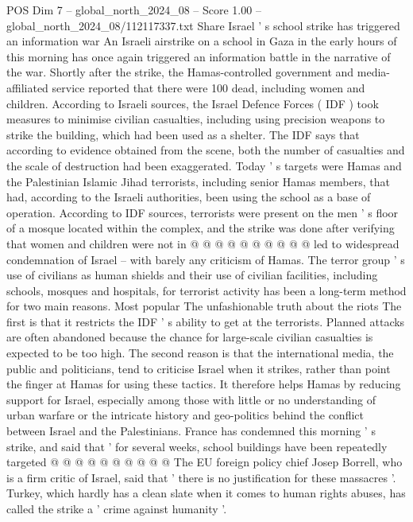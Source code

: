 \begin{textsample}{POS Dim 7 – global\_north\_2024\_08 – Score 1.00 – global\_north\_2024\_08/112117337.txt}  \label{ex:f7_pos_365}
Share Israel ' s school strike has triggered an information war An Israeli airstrike on a school in Gaza in the early hours of this morning has once again triggered an information battle in the narrative of the war.
Shortly after the strike, the Hamas-controlled government and media-affiliated service reported that there were 100 dead, including women and children.
According to Israeli sources, the Israel Defence Forces ( IDF ) took measures to minimise civilian casualties, including using precision weapons to strike the building, which had been used as a shelter.
The IDF says that according to evidence obtained from the scene, both the number of casualties and the scale of destruction had been exaggerated.
Today ' s targets were Hamas and the Palestinian Islamic Jihad terrorists, including senior Hamas members, that had, according to the Israeli authorities, been using the school as a base of operation.
According to IDF sources, terrorists were present on the men ' s floor of a mosque located within the complex, and the strike was done after verifying that women and children were not in @ @ @ @ @ @ @ @ @ @ led to widespread condemnation of Israel -- with barely any criticism of Hamas.
The terror group ' s use of civilians as human shields and their use of civilian facilities, including schools, mosques and hospitals, for terrorist activity has been a long-term method for two main reasons.
Most popular The unfashionable truth about the riots The first is that it restricts the IDF ' s ability to get at the terrorists.
Planned attacks are often abandoned because the chance for large-scale civilian casualties is expected to be too high.
The second reason is that the international media, the public and politicians, tend to criticise Israel when it strikes, rather than point the finger at Hamas for using these tactics.
It therefore helps Hamas by reducing support for Israel, especially among those with little or no understanding of urban warfare or the intricate history and geo-politics behind the conflict between Israel and the Palestinians.
France has condemned this morning ' s strike, and said that ' for several weeks, school buildings have been repeatedly targeted @ @ @ @ @ @ @ @ @ @ The EU foreign policy chief Josep Borrell, who is a firm critic of Israel, said that ' there is no justification for these massacres '.
Turkey, which hardly has a clean slate when it comes to human rights abuses, has called the strike a ' crime against humanity '.

\end{textsample}
